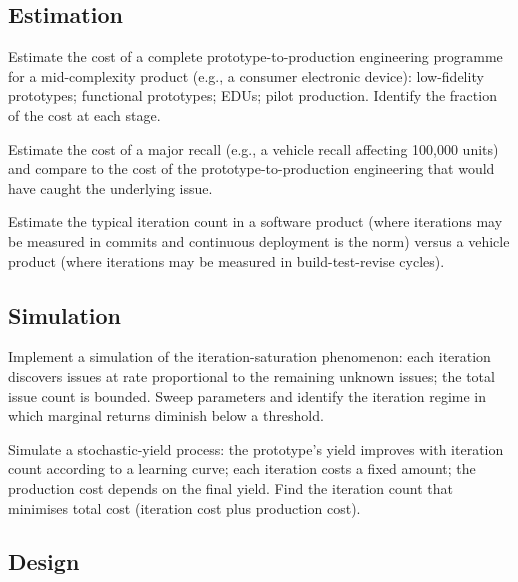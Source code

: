 \subsection*{Estimation}

\begin{exercise}
Estimate the cost of a complete prototype-to-production engineering programme for a mid-complexity product (e.g., a consumer electronic device): low-fidelity prototypes; functional prototypes; EDUs; pilot production. Identify the fraction of the cost at each stage.
\end{exercise}

\begin{exercise}
Estimate the cost of a major recall (e.g., a vehicle recall affecting 100,000 units) and compare to the cost of the prototype-to-production engineering that would have caught the underlying issue.
\end{exercise}

\begin{exercise}
Estimate the typical iteration count in a software product (where iterations may be measured in commits and continuous deployment is the norm) versus a vehicle product (where iterations may be measured in build-test-revise cycles).
\end{exercise}

\subsection*{Simulation}

\begin{exercise}
Implement a simulation of the iteration-saturation phenomenon: each iteration discovers issues at rate proportional to the remaining unknown issues; the total issue count is bounded. Sweep parameters and identify the iteration regime in which marginal returns diminish below a threshold.
\end{exercise}

\begin{exercise}
Simulate a stochastic-yield process: the prototype's yield improves with iteration count according to a learning curve; each iteration costs a fixed amount; the production cost depends on the final yield. Find the iteration count that minimises total cost (iteration cost plus production cost).
\end{exercise}

\subsection*{Design}

